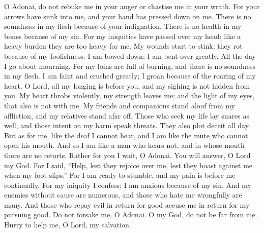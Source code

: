 \begin{biblechapter} %
 O Adonai, do not rebuke me in your anger 
or chastise me in your wrath.
\verse For your arrows have sunk into me, 
and your hand has pressed down on me.
\verse There is no soundness in my flesh because of your indignation. 
There is no health in my bones because of my sin.
\verse For my iniquities have passed over my head; 
like a heavy burden they are too heavy for me.
\verse My wounds start to stink; they rot 
because of my foolishness.
\verse I am bowed down; I am bent over greatly. 
All the day I go about mourning.
\verse For my loins are full of burning, 
and there is no soundness in my flesh.
\verse I am faint and crushed greatly; 
I groan because of the roaring of my heart.
\verse O Lord, all my longing is before you, 
and my sighing is not hidden from you.
\verse My heart throbs violently, my strength leaves me; 
and the light of my eyes, that also is not with me.
\verse My friends and companions stand aloof from my affliction, 
and my relatives stand afar off.
\verse Those who seek my life lay snares as well, 
and those intent on my harm speak threats. 
They also plot deceit all day.
\verse But as for me, like the deaf I cannot hear, 
and I am like the mute who cannot open his mouth.
\verse And so I am like a man who hears not, 
and in whose mouth there are no retorts.
\verse Rather for you I wait, O Adonai. 
You will answer, O Lord my God.
\verse For I said, “Help, lest they rejoice over me, 
lest they boast against me when my foot slips.”
\verse For I am ready to stumble, 
and my pain is before me continually.
\verse For my iniquity I confess; 
I am anxious because of my sin.
\verse And my enemies without cause are numerous, 
and those who hate me wrongfully are many.
\verse And those who repay evil in return for good 
accuse me in return for my pursuing good.
\verse Do not forsake me, O Adonai. 
O my God, do not be far from me.
\verse Hurry to help me, 
O Lord, my salvation.
\end{biblechapter}

